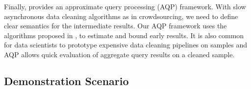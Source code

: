 Finally, \projx provides an approximate query processing (AQP) framework.
With slow asynchronous data cleaning algorithms as in crowdsourcing, we need 
to define clear semantics for the intermediate results.
Our AQP framework uses the algorithms proposed in \cite{wang1999sample}, to estimate and bound early results.
It is also common for data scientists to prototype expensive data cleaning pipelines on samples and AQP allows quick evaluation of
aggregate query results on a cleaned sample.

\subsection{Demonstration Scenario}

\fi





